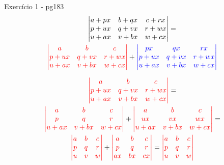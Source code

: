 \documentclass{beamer}
\begin{document}
\begin{frame}{Exercício 1 - pg183}
 \begin{gather*}
   \begin{vmatrix}
     a+px & b+qx & c+rx \\
     p+ux & q+vx & r+wx \\
     u+ ax & v+bx & w + cx
   \end{vmatrix}= \\ 
   \textcolor{red}{\begin{vmatrix}
    a & b & c \\
    p+ux & q+vx & r+wx \\
    u+ ax & v+bx & w + cx
  \end{vmatrix}} + \textcolor{blue}{\begin{vmatrix}
    px & qx & rx \\
    p+ux & q+vx & r+wx \\
    u+ ax & v+bx & w + cx
  \end{vmatrix}}
 \end{gather*} 
 
\end{frame}
\begin{frame}
\begin{gather*}
  \textcolor{red}{\begin{vmatrix}
    a & b & c \\
    p+ux & q+vx & r+wx \\
    u+ ax & v+bx & w + cx
  \end{vmatrix}}= \\
  \textcolor{red}{\begin{vmatrix}
    a & b & c \\
    p & q & r \\
    u+ ax & v+bx & w + cx
  \end{vmatrix}} + \textcolor{red}{\begin{vmatrix}
    a & b & c \\
    ux & vx & wx \\
    u+ ax & v+bx & w + cx
  \end{vmatrix}} = \\
  \textcolor{red}{\begin{vmatrix}
    a & b & c \\
    p & q & r \\
    u  & v & w 
  \end{vmatrix}} +\textcolor{red}{\begin{vmatrix}
    a & b & c \\
    p & q & r \\
   ax & bx & cx
  \end{vmatrix}} =
  \textcolor{red}{\begin{vmatrix}
    a & b & c \\
    p & q & r \\
    u & v & w 
  \end{vmatrix}}
\end{gather*}
\end{frame}
\end{document}
